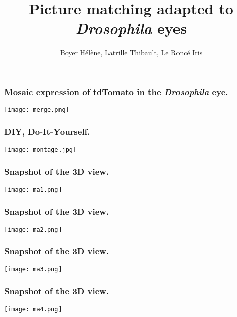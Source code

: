 \documentclass{beamer}
\author {Boyer Hélène, Latrille Thibault, Le Roncé Iris}
\title{Picture matching adapted to \textit{Drosophila} eyes }
\institute{ENS Lyon, équipe apoptose}
\begin{document}
 
\frame{\titlepage} 
\begin{frame}
\frametitle{Mosaic expression of tdTomato in the \textit{Drosophila} eye.}
	\begin{center}
       \texttt{[image: merge.png]}
	\end{center}
\end{frame}
 
\begin{frame}
\frametitle{\textbf{DIY}, Do-It-Yourself.}
	\begin{center}
       \texttt{[image: montage.jpg]}
	\end{center}
\end{frame}
 
\begin{frame}	
\frametitle{Snapshot of the 3D view.}
	\begin{center}
       \texttt{[image: ma1.png]}
	\end{center}
\end{frame}

\begin{frame}	
\frametitle{Snapshot of the 3D view.}
	\begin{center}
       \texttt{[image: ma2.png]}
	\end{center}
\end{frame}

\begin{frame}	
\frametitle{Snapshot of the 3D view.}
	\begin{center}
       \texttt{[image: ma3.png]}
	\end{center}
\end{frame}

\begin{frame}	
\frametitle{Snapshot of the 3D view.}
	\begin{center}
       \texttt{[image: ma4.png]}
	\end{center}
\end{frame}
\end{document}
